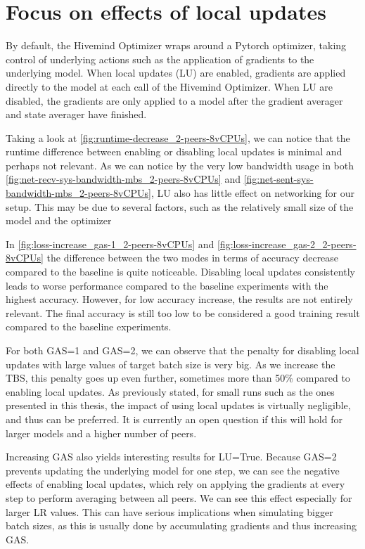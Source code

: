 \section{Focus on effects of local updates}\label{sec:focus-local-updates}
By default, the Hivemind Optimizer wraps around a Pytorch optimizer, taking control of underlying actions such as the application of gradients to the underlying model.
When local updates (LU) are enabled, gradients are applied directly to the model at each call of the Hivemind Optimizer.
When LU are disabled, the gradients are only applied to a model after the gradient averager and state averager have finished.

Taking a look at \autoref{fig:runtime-decrease_2-peers-8vCPUs}, we can notice that the runtime difference between enabling or disabling local updates is minimal and perhaps not relevant.
As we can notice by the very low bandwidth usage in both \autoref{fig:net-recv-sys-bandwidth-mbs_2-peers-8vCPUs} and \autoref{fig:net-sent-sys-bandwidth-mbs_2-peers-8vCPUs}, LU also has little effect on networking for our setup.
This may be due to several factors, such as the relatively small size of the model and the optimizer

In \autoref{fig:loss-increase_gas-1_2-peers-8vCPUs} and \autoref{fig:loss-increase_gas-2_2-peers-8vCPUs} the difference between the two modes in terms of accuracy decrease compared to the baseline is quite noticeable.
Disabling local updates consistently leads to worse performance compared to the baseline experiments with the highest accuracy.
However, for low accuracy increase, the results are not entirely relevant.
The final accuracy is still too low to be considered a good training result compared to the baseline experiments.

For both GAS=1 and GAS=2, we can observe that the penalty for disabling local updates with large values of target batch size is very big.
As we increase the TBS, this penalty goes up even further, sometimes more than 50\% compared to enabling local updates.
As previously stated, for small runs such as the ones presented in this thesis, the impact of using local updates is virtually negligible, and thus can be preferred.
It is currently an open question if this will hold for larger models and a higher number of peers.

Increasing GAS also yields interesting results for LU=True.
Because GAS=2 prevents updating the underlying model for one step, we can see the negative effects of enabling local updates, which rely on applying the gradients at every step to perform averaging between all peers.
We can see this effect especially for larger LR values.
This can have serious implications when simulating bigger batch sizes, as this is usually done by accumulating gradients and thus increasing GAS.

